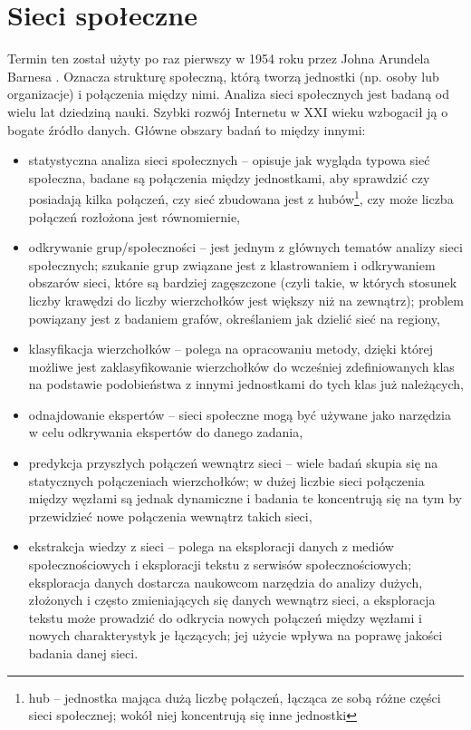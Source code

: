 \section{Sieci społeczne}
Termin ten został użyty po raz pierwszy w 1954 roku przez Johna Arundela Barnesa
\cite{JABarnes}. Oznacza strukturę społeczną, którą tworzą jednostki (np. osoby
lub organizacje) i połączenia między nimi.
Analiza sieci społecznych jest badaną od wielu lat dziedziną nauki. Szybki
rozwój Internetu w XXI wieku wzbogacił ją o bogate źródło danych. Główne obszary
badań \cite{SNDAtopics} to między innymi:
\begin{itemize}
  \item statystyczna analiza sieci społecznych -- opisuje jak wygląda typowa sieć społeczna,
  badane są połączenia między jednostkami, aby sprawdzić czy posiadają kilka połączeń,
  czy sieć zbudowana jest z hubów\footnote{hub -- jednostka mająca dużą liczbę
  połączeń, łącząca ze sobą różne części sieci społecznej; wokół niej
  koncentrują się inne jednostki}, czy może liczba połączeń rozłożona jest równomiernie,
  
  \item odkrywanie grup/społeczności -- jest jednym z głównych tematów analizy 
  sieci społecznych; szukanie grup związane jest z klastrowaniem i odkrywaniem 
  obszarów sieci, które są bardziej zagęszczone (czyli takie, w których
  stosunek liczby krawędzi do liczby wierzchołków jest większy niż na zewnątrz);
  problem powiązany jest z badaniem grafów, określaniem jak dzielić sieć na regiony,
  
  \item klasyfikacja wierzchołków -- polega na opracowaniu metody, dzięki której
  możliwe jest zaklasyfikowanie wierzchołków do wcześniej zdefiniowanych klas na
  podstawie podobieństwa z innymi jednostkami do tych klas już należących,
  
  \item odnajdowanie ekspertów -- sieci społeczne mogą być używane jako narzędzia
  w celu odkrywania ekspertów do danego zadania,
  
  \item predykcja przyszłych połączeń wewnątrz sieci -- wiele badań skupia się
  na statycznych połączeniach wierzchołków; w dużej liczbie sieci połączenia
  między węzłami są jednak dynamiczne i badania te koncentrują się na tym by
  przewidzieć nowe połączenia wewnątrz takich sieci,
  
  \item ekstrakcja wiedzy z sieci -- polega na eksploracji danych z mediów 
  społecznościowych i eksploracji tekstu z serwisów społecznościowych; 
  eksploracja danych dostarcza naukowcom narzędzia do analizy dużych, 
  złożonych i często zmieniających się danych wewnątrz sieci, a eksploracja tekstu
  może prowadzić do odkrycia nowych połączeń między węzłami i nowych
  charakterystyk je łączących; jej użycie wpływa na poprawę jakości
  badania danej sieci. 
\end{itemize}



